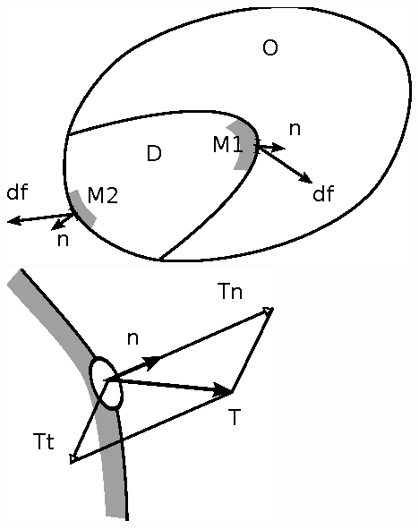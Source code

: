     \begin{center}
    \includegraphics{../images/T1_Ch02-0001}\qquad
    \includegraphics{../images/T1_Ch02-0002}
    \end{center}

